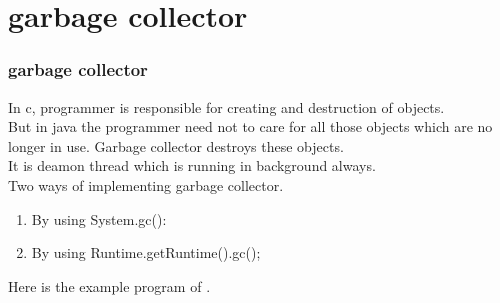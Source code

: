 \documentclass{beamer}
\begin{document}
\section{garbage collector}
\begin{frame}
    \frametitle{garbage collector}
    In c, programmer is responsible for creating and destruction of objects.\\
    But in java the programmer need not to care for all those objects which are no longer in use. Garbage collector destroys these objects. \\
    It is deamon thread which is running in background always.\\
    Two ways of implementing garbage collector.\\
    \begin{enumerate}
        \item By using System.gc():
        \item By using Runtime.getRuntime().gc(); 
    \end{enumerate}
    Here is the example program of \href{garbage.java}{\color{green}{garbage collector}}.
\end{frame}
\end{document}
